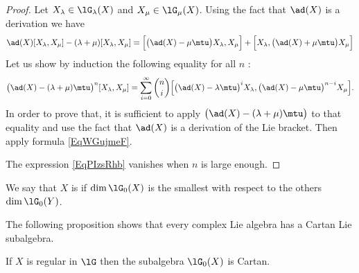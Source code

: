 \begin{proof}
    Let \( X_{\lambda}\in\lG_{\lambda}(X)\) and \( X_{\mu}\in\lG_{\mu}(X)\). Using the fact that \( \ad(X)\) is a derivation we have
    \begin{equation}
        \ad(X)[X_{\lambda},X_{\mu}]-(\lambda+\mu)[X_{\lambda},X_{\mu}]=\Big[ \big( \ad(X)-\mu\mtu \big)X_{\lambda},X_{\mu} \Big]+\Big[ X_{\lambda},\big( \ad(X)+\mu\mtu \big)X_{\mu} \Big]
    \end{equation}
    Let us show by induction the following equality for all \( n\) :
    \begin{equation}    \label{EqPIzsRhb}
        \big( \ad(X)-(\lambda+\mu)\mtu \big)^n[X_{\lambda},X_{\mu}]=\sum_{i=0}^{\infty}\binom{ n }{ i }\Big[ \big( \ad(X)-\lambda\mtu \big)^iX_{\lambda},\big( \ad(X)-\mu\mtu \big)^{n-i}X_{\mu} \Big].
    \end{equation}
    In order to prove that, it is sufficient to apply \( \big( \ad(X)-(\lambda+\mu)\mtu \big)\) to that equality and use the fact that \( \ad(X)\) is a derivation of the Lie bracket. Then apply formula \eqref{EqWGujmeF}.
    
The expression \eqref{EqPIzsRhb} vanishes when \( n\) is large enough.
\end{proof}

We say that \( X\) is  if \( \dim\lG_0(X)\) is the smallest with respect to the others \( \dim\lG_0(Y)\).

The following proposition shows that every complex Lie algebra has a Cartan Lie subalgebra.
\begin{proposition}
    If $X$ is regular in \( \lG\) then the subalgebra \( \lG_0(X)\) is Cartan.
\end{proposition}

